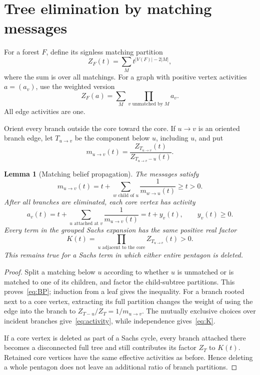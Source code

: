 \documentclass[11pt]{article}
\newtheorem{lemma}[theorem]{Lemma}
\theoremstyle{remark}
\begin{document}
\section{Tree elimination by matching messages}

For a forest $F$, define its signless matching partition
\begin{equation}\label{eq:forest-Z}
 Z_F(t)=\sum_M t^{|V(F)|-2|M|},
\end{equation}
where the sum is over all matchings.  For a graph with positive vertex
activities $a=(a_v)$, use the weighted version
\begin{equation}\label{eq:weighted-Z}
 Z_F(a)=\sum_M\prod_{v\text{ unmatched by }M}a_v.
\end{equation}
All edge activities are one.

Orient every branch outside the core toward the core.  If $u\to v$ is an
oriented branch edge, let $T_{u\to v}$ be the component below $u$, including
$u$, and put
\begin{equation}\label{eq:message-definition}
 m_{u\to v}(t)=
 \frac{Z_{T_{u\to v}}(t)}{Z_{T_{u\to v}-u}(t)}.
\end{equation}

\begin{lemma}[Matching belief propagation]\label{lem:BP}
The messages satisfy
\begin{equation}\label{eq:BP}
 m_{u\to v}(t)=t+\sum_{w\text{ child of }u}
                    \frac1{m_{w\to u}(t)}\geq t>0.
\end{equation}
After all branches are eliminated, each core vertex has activity
\begin{equation}\label{eq:activity}
 a_v(t)=t+\sum_{u\text{ attached at }v}\frac1{m_{u\to v}(t)}
       =t+y_v(t),
 \qquad y_v(t)\geq0.
\end{equation}
Every term in the grouped Sachs expansion has the same positive real factor
\begin{equation}\label{eq:K}
 K(t)=\prod_{u\text{ adjacent to the core}}Z_{T_{u\to v}}(t)>0.
\end{equation}
This remains true for a Sachs term in which either entire pentagon is
deleted.
\end{lemma}

\begin{proof}
Split a matching below $u$ according to whether $u$ is unmatched or is
matched to one of its children, and factor the child-subtree partitions.
This proves~\eqref{eq:BP}; induction from a leaf gives the inequality.
For a branch rooted next to a core vertex, extracting its full partition
changes the weight of using the edge into the branch to
$Z_{T-u}/Z_T=1/m_{u\to v}$.  The mutually exclusive choices over incident
branches give~\eqref{eq:activity}, while independence gives~\eqref{eq:K}.

If a core vertex is deleted as part of a Sachs cycle, every branch attached
there becomes a disconnected full tree and still contributes its factor
$Z_T$ to $K(t)$.  Retained core vertices have the same effective activities
as before.  Hence deleting a whole pentagon does not leave an additional
ratio of branch partitions.
\end{proof}
\end{document}
